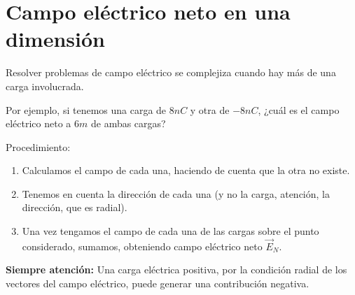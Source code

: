 \section{Campo eléctrico neto en una dimensión}

Resolver problemas de campo eléctrico se complejiza cuando hay más de una carga 
involucrada.

Por ejemplo, si tenemos una carga de \(8nC\) y otra de \(-8nC\),
¿cuál es el campo eléctrico neto a \(6m\) de ambas cargas?

Procedimiento:
\begin{enumerate}
    \item Calculamos el campo de cada una,
    haciendo de cuenta que la otra no existe.
    \item Tenemos en cuenta la dirección de cada una
    (y no la carga, atención, la dirección, que es radial).
    \item Una vez tengamos el campo de cada una de las cargas sobre el punto 
    considerado, sumamos, obteniendo campo eléctrico neto \(\vec{E}_N\).
\end{enumerate}

\textbf{Siempre atención: }
Una carga eléctrica positiva,
por la condición radial de los vectores del campo eléctrico,
puede generar una contribución negativa.